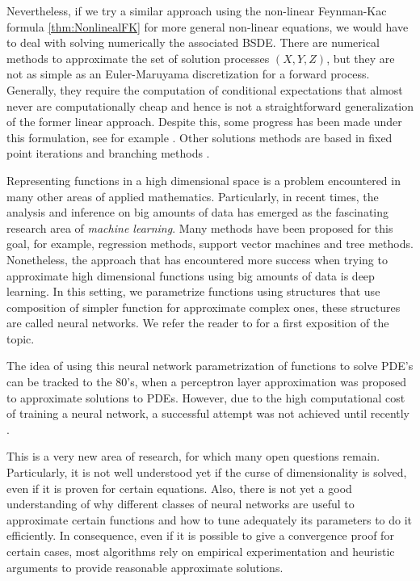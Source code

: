 Nevertheless, if we try a similar approach using the non-linear Feynman-Kac formula \ref{thm:NonlinealFK} for more general non-linear equations, we would have to deal with solving numerically the associated BSDE. There are numerical methods to approximate the set of solution processes $(X,Y,Z)$, but they are not as simple as an Euler-Maruyama discretization for a forward process. Generally, they require the computation of conditional expectations that almost never are computationally cheap and hence is not a straightforward generalization of the former linear approach. Despite this, some progress has been made under this formulation, see for example \cite{chessari_numerical_nodate}. Other solutions methods are based in fixed point iterations and branching methods \cite{e_algorithms_2022}.

Representing functions in a high dimensional space is a problem encountered in many other areas of applied mathematics. Particularly, in recent times, the analysis and inference on big amounts of data has emerged as the fascinating research area of \textit{machine learning}. Many methods have been proposed for this goal, for example, regression methods, support vector machines and tree methods. Nonetheless, the approach that has encountered more success when trying to approximate high dimensional functions using big amounts of data is deep learning.  In this setting, we parametrize functions using structures that use composition of simpler function for approximate complex ones, these structures are called neural networks. We refer the reader to \cite{higham_deep_2019} for a first exposition of the topic.

The idea of using this neural network parametrization of functions to solve PDE's can be tracked to the 80's, when a perceptron layer approximation was proposed to approximate solutions to PDEs. However, due to the high computational cost of training a neural network, a successful attempt was not achieved until recently \cite{beck_machine_2019}. 

This is a very new area of research, for which many open questions remain. Particularly, it is not well understood yet if the curse of dimensionality is solved, even if it is proven for certain equations. Also, there is not yet a good understanding of why different classes of neural networks are useful to approximate certain functions and how to tune adequately its parameters to do it efficiently. In consequence, even if it is possible to give a convergence proof for certain cases, most algorithms rely on empirical experimentation and heuristic arguments to provide reasonable approximate solutions.    

